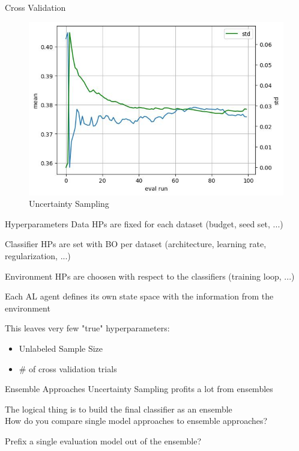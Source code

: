 \documentclass[aspectratio=169, 11pt, invertlogo]{ismll-slides}
\begin{document}
\begin{frame}[fragile]{Cross Validation}
	\begin{figure}
		\centering
		\includegraphics[width=.7\linewidth]{pics/splice_margin100_convergence.jpg}
		\caption*{Uncertainty Sampling}
	\end{figure}
\end{frame}


\begin{frame}[fragile]{Hyperparameters}
	Data HPs are fixed for each dataset (budget, seed set, ...)
	
	Classifier HPs are set with BO per dataset (architecture, learning rate, regularization, ...)
	
	Environment HPs are choosen with respect to the classifiers (training loop, ...)
	
	Each AL agent defines its own state space with the information from the environment
	
	This leaves very few "true" hyperparameters: 
	\begin{itemize}
		\item Unlabeled Sample Size
		\item \# of cross validation trials
	\end{itemize}
\end{frame}


\begin{frame}[fragile]{Ensemble Approaches}
	Uncertainty Sampling profits a lot from ensembles
	
	The logical thing is to build the final classifier as an ensemble \\ [7mm]
	How do you compare single model approaches to ensemble approaches?
	
	Prefix a single evaluation model out of the ensemble?
\end{frame}
\end{document}
